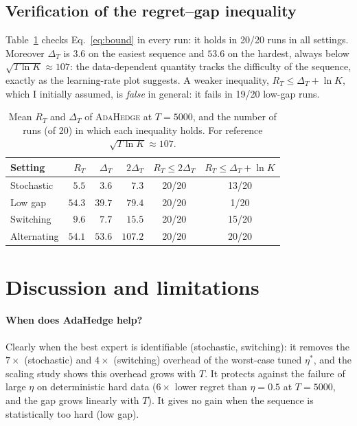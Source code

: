 \documentclass[11pt,a4paper]{article}
\newcommand{\Ada}{\textsc{AdaHedge}}
\newcommand{\lnK}{\ln K}
\begin{document}
\subsection{Verification of the regret--gap inequality}
Table~\ref{tab:bound} checks Eq.~\eqref{eq:bound} in every run: it holds in 20/20 runs in all settings. Moreover $\Delta_T$ is $3.6$ on the easiest sequence and $53.6$ on the hardest, always below $\sqrt{T\lnK}\approx107$: the data-dependent quantity tracks the difficulty of the sequence, exactly as the learning-rate plot suggests.
A weaker inequality, $R_T\le\Delta_T+\lnK$, which I initially assumed, is \emph{false} in general: it fails in 19/20 low-gap runs.

\begin{table}[t]
\centering\small
\begin{tabular}{lrrrcc}
\toprule
Setting & $R_T$ & $\Delta_T$ & $2\Delta_T$ & $R_T\le2\Delta_T$ & $R_T\le\Delta_T+\lnK$\\
\midrule
Stochastic & $5.5$ & $3.6$ & $7.3$ & 20/20 & 13/20 \\
Low gap & $54.3$ & $39.7$ & $79.4$ & 20/20 & 1/20 \\
Switching & $9.6$ & $7.7$ & $15.5$ & 20/20 & 15/20 \\
Alternating & $54.1$ & $53.6$ & $107.2$ & 20/20 & 20/20\\
\bottomrule
\end{tabular}
\caption{Mean $R_T$ and $\Delta_T$ of \Ada{} at $T=5000$, and the number of runs (of 20) in which each inequality holds. For reference $\sqrt{T\lnK}\approx107$.}
\label{tab:bound}
\end{table}

\section{Discussion and limitations}\label{sec:discussion}
\paragraph{When does AdaHedge help?} Clearly when the best expert is identifiable (stochastic, switching): it removes the $7\times$ (stochastic) and $4\times$ (switching) overhead of the worst-case tuned $\eta^*$, and the scaling study shows this overhead grows with $T$.
It protects against the failure of large $\eta$ on deterministic hard data ($6\times$ lower regret than $\eta=0.5$ at $T=5000$, and the gap grows linearly with $T$). It gives no gain when the sequence is statistically too hard (low gap).
\end{document}
